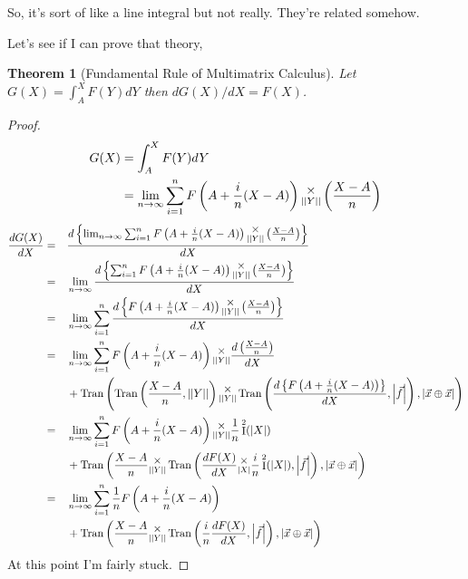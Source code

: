 \documentclass[12pt]{book}
\theoremstyle{plain}
\newtheorem{theorem}{Theorem}[chapter]
\theoremstyle{definition}
\theoremstyle{ppart}
\theoremstyle{case}
\theoremstyle{solution}
\DeclareMathOperator{\Ident}{I}
\DeclareMathOperator{\Tran}{Tran}
\newcommand{\mmult}[1]{\text{\raisebox{1ex}{$\underset{#1}{\times}$}}}
\newcommand{\shape}[1]{\left|#1\right|}
\begin{document}
So, it's sort of like a line integral but not really. They're related somehow.

\begin{landscape}
Let's see if I can prove that theory,
\begin{theorem}[Fundamental Rule of Multimatrix Calculus]
Let $G(X) = \int_A^X F(Y) dY$ then $dG(X)/dX = F(X)$.
\end{theorem}
\begin{proof}
\begin{align*}
  G(X)
  &= \int_A^X F(Y) dY \\
  &= 
    \lim_{n \to \infty}
     \sum_{i=1}^n
      F\left(A+\frac{i}{n}(X-A)\right)
      \mmult{\shape{\shape{Y}}}
      \left(\frac{X-A}{n}\right)
\end{align*}
\begin{alignat*}{3}
  \frac{dG(X)}{dX}
  &=&&
    \frac{
      d \left\{
      \lim_{n \to \infty}
      \sum_{i=1}^n
        F\left(A+\frac{i}{n}(X-A)\right)
        \mmult{\shape{\shape{Y}}}
        \left(\frac{X-A}{n}\right)
      \right\}
    }{dX} \\
  &=&&
    \lim_{n \to \infty}
    \frac{
      d \left\{
      \sum_{i=1}^n
        F\left(A+\frac{i}{n}(X-A)\right)
        \mmult{\shape{\shape{Y}}}
        \left(\frac{X-A}{n}\right)
      \right\}
    }{dX} \\
  &=&&
    \lim_{n \to \infty}
    \sum_{i=1}^n
      \frac{
        d \left\{
          F\left(A+\frac{i}{n}(X-A)\right)
          \mmult{\shape{\shape{Y}}}
          \left(\frac{X-A}{n}\right)
        \right\}
      }{dX} \\
  &=&&
    \lim_{n \to \infty}
      \sum_{i=1}^n
        F\left(A+\frac{i}{n}(X-A)\right)
          \mmult{\shape{\shape{Y}}}
          \frac{d \left(\frac{X-A}{n}\right)}{dX}
        \\&&&+
        \Tran\left(
          \Tran\left(\frac{X-A}{n}, \shape{\shape{Y}}\right)
          \mmult{\shape{\shape{Y}}}
          \Tran\left(\frac{
            d \left\{F\left(A+\frac{i}{n}(X-A)\right)\right\}
          }{dX}, \shape{\vec{f}}\right),
          \shape{\vec{x} \oplus \vec{x}}
        \right) \\
  &=&&
    \lim_{n \to \infty}
      \sum_{i=1}^n
        F\left(A+\frac{i}{n}(X-A)\right)
          \mmult{\shape{\shape{Y}}}
          \frac{1}{n}\Ident^2(\shape{X})
        \\&&&+
        \Tran\left(
          \frac{X-A}{n}
          \mmult{\shape{\shape{Y}}}
          \Tran\left(
            \frac{dF(X)}{dX}
            \mmult{\shape{X}}
            \frac{i}{n}\Ident^2(\shape{X}), \shape{\vec{f}}\right),
          \shape{\vec{x} \oplus \vec{x}}
        \right) \\
  &=&&
    \lim_{n \to \infty}
      \sum_{i=1}^n
        \frac{1}{n}F\left(A+\frac{i}{n}(X-A)\right)
        \\&&&+
        \Tran\left(
          \frac{X-A}{n}
          \mmult{\shape{\shape{Y}}}
          \Tran\left(
            \frac{i}{n}\frac{dF(X)}{dX}
            , \shape{\vec{f}}\right),
          \shape{\vec{x} \oplus \vec{x}}
        \right)
\end{alignat*}
At this point I'm fairly stuck.


\end{proof}
\end{landscape}
\end{document}
